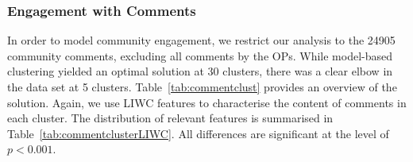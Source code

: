 




% 
% 

\subsubsection{Engagement with Comments}

In order to model community engagement, we restrict our analysis to the 24905 community comments, excluding all comments by the OPs.
While model-based clustering yielded an optimal solution at 30 clusters,  there was  a clear elbow in the data set at 5 clusters. Table~\ref{tab:commentclust} provides an overview of the solution. Again, we use LIWC features to characterise the content of comments in each cluster. The distribution of relevant features is summarised in Table~\ref{tab:commentclusterLIWC}. All differences are significant at the level of $p<0.001$. 

